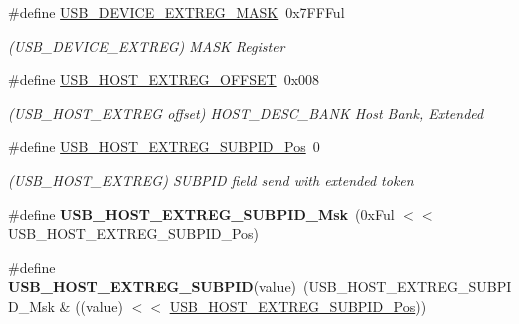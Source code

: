 \begin{DoxyCompactItemize}
\item 
\hypertarget{group___s_a_m_l21___u_s_b_ga222b98813ce7a2db7068e6531f0a7c72}{}\#define \hyperlink{group___s_a_m_l21___u_s_b_ga222b98813ce7a2db7068e6531f0a7c72}{U\+S\+B\+\_\+\+D\+E\+V\+I\+C\+E\+\_\+\+E\+X\+T\+R\+E\+G\+\_\+\+M\+A\+S\+K}~0x7\+F\+F\+Ful\label{group___s_a_m_l21___u_s_b_ga222b98813ce7a2db7068e6531f0a7c72}

\begin{DoxyCompactList}\small\item\em (U\+S\+B\+\_\+\+D\+E\+V\+I\+C\+E\+\_\+\+E\+X\+T\+R\+E\+G) M\+A\+S\+K Register \end{DoxyCompactList}\item 
\hypertarget{group___s_a_m_l21___u_s_b_ga9952617bf60fc9e0ab0a400a7546d98b}{}\#define \hyperlink{group___s_a_m_l21___u_s_b_ga9952617bf60fc9e0ab0a400a7546d98b}{U\+S\+B\+\_\+\+H\+O\+S\+T\+\_\+\+E\+X\+T\+R\+E\+G\+\_\+\+O\+F\+F\+S\+E\+T}~0x008\label{group___s_a_m_l21___u_s_b_ga9952617bf60fc9e0ab0a400a7546d98b}

\begin{DoxyCompactList}\small\item\em (U\+S\+B\+\_\+\+H\+O\+S\+T\+\_\+\+E\+X\+T\+R\+E\+G offset) H\+O\+S\+T\+\_\+\+D\+E\+S\+C\+\_\+\+B\+A\+N\+K Host Bank, Extended \end{DoxyCompactList}\item 
\hypertarget{group___s_a_m_l21___u_s_b_ga5e4cfab95db765a11252171562b33696}{}\#define \hyperlink{group___s_a_m_l21___u_s_b_ga5e4cfab95db765a11252171562b33696}{U\+S\+B\+\_\+\+H\+O\+S\+T\+\_\+\+E\+X\+T\+R\+E\+G\+\_\+\+S\+U\+B\+P\+I\+D\+\_\+\+Pos}~0\label{group___s_a_m_l21___u_s_b_ga5e4cfab95db765a11252171562b33696}

\begin{DoxyCompactList}\small\item\em (U\+S\+B\+\_\+\+H\+O\+S\+T\+\_\+\+E\+X\+T\+R\+E\+G) S\+U\+B\+P\+I\+D field send with extended token \end{DoxyCompactList}\item 
\hypertarget{group___s_a_m_l21___u_s_b_gadc8779a8445054a47c15dca18910f28c}{}\#define {\bfseries U\+S\+B\+\_\+\+H\+O\+S\+T\+\_\+\+E\+X\+T\+R\+E\+G\+\_\+\+S\+U\+B\+P\+I\+D\+\_\+\+Msk}~(0x\+Ful $<$$<$ U\+S\+B\+\_\+\+H\+O\+S\+T\+\_\+\+E\+X\+T\+R\+E\+G\+\_\+\+S\+U\+B\+P\+I\+D\+\_\+\+Pos)\label{group___s_a_m_l21___u_s_b_gadc8779a8445054a47c15dca18910f28c}

\item 
\hypertarget{group___s_a_m_l21___u_s_b_gae1b4eb5c53b9eec548f994c8e89d7417}{}\#define {\bfseries U\+S\+B\+\_\+\+H\+O\+S\+T\+\_\+\+E\+X\+T\+R\+E\+G\+\_\+\+S\+U\+B\+P\+I\+D}(value)~(U\+S\+B\+\_\+\+H\+O\+S\+T\+\_\+\+E\+X\+T\+R\+E\+G\+\_\+\+S\+U\+B\+P\+I\+D\+\_\+\+Msk \& ((value) $<$$<$ \hyperlink{group___s_a_m_l21___u_s_b_ga5e4cfab95db765a11252171562b33696}{U\+S\+B\+\_\+\+H\+O\+S\+T\+\_\+\+E\+X\+T\+R\+E\+G\+\_\+\+S\+U\+B\+P\+I\+D\+\_\+\+Pos}))\label{group___s_a_m_l21___u_s_b_gae1b4eb5c53b9eec548f994c8e89d7417}


\end{DoxyCompactItemize}
